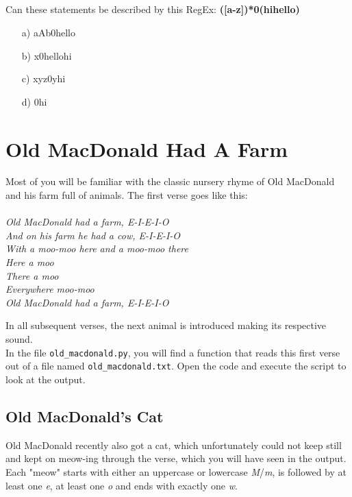 \subsection{}
Can these statements be described by this RegEx: \textbf{([a-z]\textbar [A-Z])*0(hi\textbar hello)}
\begin{itemize}
\item[a)] aAb0hello 
\item[b)] x0hellohi 
\item[c)] xyz0yhi 
\item[d)] 0hi 
\end{itemize}


\section{Old MacDonald Had A Farm}
Most of you will be familiar with the classic nursery rhyme of Old MacDonald and his farm full of animals. The first verse goes like this:\\\\
\textit{Old MacDonald had a farm, E-I-E-I-O\\
And on his farm he had a cow, E-I-E-I-O\\
With a moo-moo here and a moo-moo there\\
Here a moo\\
There a moo\\
Everywhere moo-moo\\
Old MacDonald had a farm, E-I-E-I-O\\
}

\noindent In all subsequent verses, the next animal is introduced making its respective sound.\\
In the file \texttt{old\_macdonald.py}, you will find a function that reads this first verse out of a file named \texttt{old\_macdonald.txt}. Open the code and execute the script to look at the output.

\subsection{Old MacDonald's Cat}
Old MacDonald recently also got a cat, which unfortunately could not keep still and kept on meow-ing through the verse, which you will have seen in the output.\\
Each "meow" starts with either an uppercase or lowercase \textit{M}/\textit{m}, is followed by at least one \textit{e}, at least one \textit{o} and ends with exactly one \textit{w}.\\

